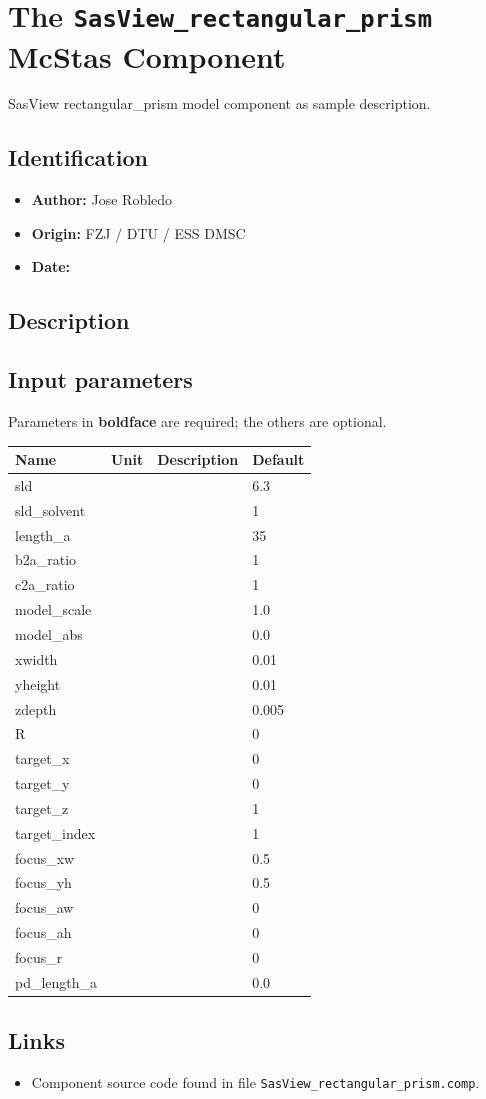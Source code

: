 \section{The \texttt{SasView\_rectangular\_prism} McStas Component}
SasView rectangular\_prism model component as sample description.

\subsection*{Identification}
\begin{itemize}
  \item \textbf{Author:} Jose Robledo
  \item \textbf{Origin:} FZJ / DTU / ESS DMSC
  \item \textbf{Date:} 
\end{itemize}

\subsection*{Description}


\subsection*{Input parameters}
Parameters in \textbf{boldface} are required; the others are optional.

\begin{longtable}{p{}p{}p{}p{}}
\toprule
\textbf{Name} & \textbf{Unit} & \textbf{Description} & \textbf{Default} \\
\midrule
\endhead
sld &  &  & 6.3 \\
sld\_solvent &  &  & 1 \\
length\_a &  &  & 35 \\
b2a\_ratio &  &  & 1 \\
c2a\_ratio &  &  & 1 \\
model\_scale &  &  & 1.0 \\
model\_abs &  &  & 0.0 \\
xwidth &  &  & 0.01 \\
yheight &  &  & 0.01 \\
zdepth &  &  & 0.005 \\
R &  &  & 0 \\
target\_x &  &  & 0 \\
target\_y &  &  & 0 \\
target\_z &  &  & 1 \\
target\_index &  &  & 1 \\
focus\_xw &  &  & 0.5 \\
focus\_yh &  &  & 0.5 \\
focus\_aw &  &  & 0 \\
focus\_ah &  &  & 0 \\
focus\_r &  &  & 0 \\
pd\_length\_a &  &  & 0.0 \\
\bottomrule
\end{longtable}

\subsection*{Links}
\begin{itemize}
  \item Component source code found in file \texttt{SasView\_rectangular\_prism.comp}.
\end{itemize}
